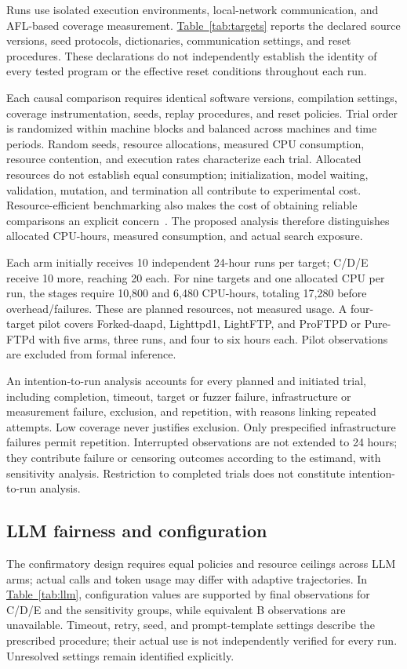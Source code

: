 \documentclass[final,5p,times,number]{elsarticle}
\newcommand{\namedref}[2]{\hyperref[#2]{#1~\ref*{#2}}}
\begin{document}
Runs use isolated execution environments, local-network communication, and AFL-based coverage measurement. \namedref{Table}{tab:targets} reports the declared source versions, seed protocols, dictionaries, communication settings, and reset procedures. These declarations do not independently establish the identity of every tested program or the effective reset conditions throughout each run.

Each causal comparison requires identical software versions, compilation settings, coverage instrumentation, seeds, replay procedures, and reset policies. Trial order is randomized within machine blocks and balanced across machines and time periods. Random seeds, resource allocations, measured CPU consumption, resource contention, and execution rates characterize each trial. Allocated resources do not establish equal consumption; initialization, model waiting, validation, mutation, and termination all contribute to experimental cost. Resource-efficient benchmarking also makes the cost of obtaining reliable comparisons an explicit concern~\cite{greenbenchmark2023}. The proposed analysis therefore distinguishes allocated CPU-hours, measured consumption, and actual search exposure.

Each arm initially receives 10 independent 24-hour runs per target; C/D/E receive 10 more, reaching 20 each. For nine targets and one allocated CPU per run, the stages require 10,800 and 6,480 CPU-hours, totaling 17,280 before overhead/failures. These are planned resources, not measured usage. A four-target pilot covers Forked-daapd, Lighttpd1, LightFTP, and ProFTPD or Pure-FTPd with five arms, three runs, and four to six hours each. Pilot observations are excluded from formal inference.

An intention-to-run analysis accounts for every planned and initiated trial, including completion, timeout, target or fuzzer failure, infrastructure or measurement failure, exclusion, and repetition, with reasons linking repeated attempts. Low coverage never justifies exclusion. Only prespecified infrastructure failures permit repetition. Interrupted observations are not extended to 24 hours; they contribute failure or censoring outcomes according to the estimand, with sensitivity analysis. Restriction to completed trials does not constitute intention-to-run analysis.

\subsection{LLM fairness and configuration}
The confirmatory design requires equal policies and resource ceilings across LLM arms; actual calls and token usage may differ with adaptive trajectories. In \namedref{Table}{tab:llm}, configuration values are supported by final observations for C/D/E and the sensitivity groups, while equivalent B observations are unavailable. Timeout, retry, seed, and prompt-template settings describe the prescribed procedure; their actual use is not independently verified for every run. Unresolved settings remain identified explicitly.
\end{document}
